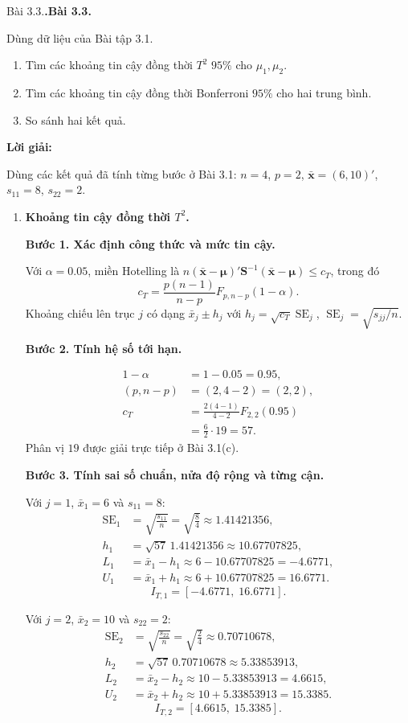 \documentclass[11pt,a4paper]{article}
\makeatletter
\renewcommand{\boldsymbol}[1]{\symbf{#1}}
\newcounter{prob}
\newenvironment{problem}[1][]{%
  \par\addvspace{14pt}\noindent\begin{minipage}{\linewidth}
  \def\@tempa{#1}%
  \ifx\@tempa\@empty\refstepcounter{prob}\textbf{\theprob.}\else\textbf{#1}\fi
  \ \ignorespaces
}{\par\end{minipage}\par\nopagebreak[4]}
\newenvironment{solution}{%
  \par\medskip\noindent\textbf{Lời giải:}\par\nobreak\smallskip\noindent\ignorespaces
}{\par}
\newcommand{\answer}[1]{\boxed{#1}}
\newcommand{\step}[2]{\par\medskip\noindent\textbf{Bước #1. #2}\par\nopagebreak[4]\smallskip\noindent}
\makeatother
\begin{document}
\begin{problem}[Bài 3.3.]
Dùng dữ liệu của Bài tập 3.1.
\begin{enumerate}[label=(\alph*)]
\item Tìm các khoảng tin cậy đồng thời $T^2$ $95\%$ cho $\mu_1,\mu_2$.
\item Tìm các khoảng tin cậy đồng thời Bonferroni $95\%$ cho hai trung bình.
\item So sánh hai kết quả.
\end{enumerate}
\end{problem}
\begin{solution}
Dùng các kết quả đã tính từng bước ở Bài 3.1:
$n=4$, $p=2$, $\bar{\mathbf{x}}=(6,10)'$, $s_{11}=8$, $s_{22}=2$.
\begin{enumerate}[label=\textbf{\alph*)}]
\item \textbf{Khoảng tin cậy đồng thời $T^2$.}\par\nopagebreak[4]
\step{1}{Xác định công thức và mức tin cậy.}
Với $\alpha=0.05$, miền Hotelling là
$n(\bar{\mathbf{x}}-\boldsymbol{\mu})'\mathbf{S}^{-1}
(\bar{\mathbf{x}}-\boldsymbol{\mu})\le c_T$, trong đó
\[
c_T=\frac{p(n-1)}{n-p}F_{p,n-p}(1-\alpha).
\]
Khoảng chiếu lên trục $j$ có dạng $\bar{x}_j\pm h_j$ với
$h_j=\sqrt{c_T}\operatorname{SE}_j$, $\operatorname{SE}_j=\sqrt{s_{jj}/n}$.
\step{2}{Tính hệ số tới hạn.}
\begin{align*}
1-\alpha&=1-0.05=0.95,\\
(p,n-p)&=(2,4-2)=(2,2),\\
c_T&=\frac{2(4-1)}{4-2}F_{2,2}(0.95)\\
&=\frac62\cdot19=57.
\end{align*}
Phân vị $19$ được giải trực tiếp ở Bài 3.1(c).
\step{3}{Tính sai số chuẩn, nửa độ rộng và từng cận.}
\begin{samepage}
Với $j=1$, $\bar{x}_1=6$ và $s_{11}=8$:
\begin{align*}
\operatorname{SE}_{1}&=\sqrt{\frac{s_{11}}{n}}
=\sqrt{\frac{8}{4}}\approx1.41421356,\\
h_{1}&=\sqrt{57}\,1.41421356\approx10.67707825,\\
L_{1}&=\bar{x}_{1}-h_{1}
\approx 6-10.67707825=-4.6771,\\
U_{1}&=\bar{x}_{1}+h_{1}
\approx 6+10.67707825=16.6771.
\end{align*}
\[
\answer{I_{T,1}=[-4.6771,\;16.6771]}.
\]
\end{samepage}

\begin{samepage}
Với $j=2$, $\bar{x}_2=10$ và $s_{22}=2$:
\begin{align*}
\operatorname{SE}_{2}&=\sqrt{\frac{s_{22}}{n}}
=\sqrt{\frac{2}{4}}\approx0.70710678,\\
h_{2}&=\sqrt{57}\,0.70710678\approx5.33853913,\\
L_{2}&=\bar{x}_{2}-h_{2}
\approx 10-5.33853913=4.6615,\\
U_{2}&=\bar{x}_{2}+h_{2}
\approx 10+5.33853913=15.3385.
\end{align*}
\[
\answer{I_{T,2}=[4.6615,\;15.3385]}.
\]
\end{samepage}


\end{enumerate}
\end{solution}
\end{document}
